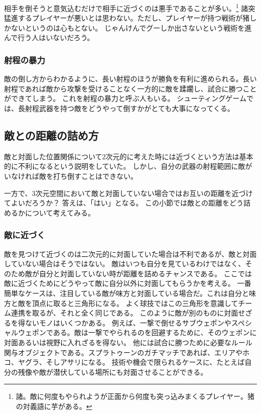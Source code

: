 \documentclass[a4paper,11pt]{jsbook}
\begin{document}
相手を倒そうと意気込むだけで相手に近づくのは悪手であることが多い。\footnote{諸。敵に何度もやられようが正面から何度も突っ込みまくるプレイヤー。猪の対義語に芋がある。}
諸突猛進するプレイヤーが悪いとは思わない。ただし、プレイヤーが持つ戦術が猪しかないというのは心もとない。
じゃんけんでグーしか出さないという戦術を進んで行う人はいないだろう。

\subsubsection{射程の暴力}
敵の倒し方からわかるように、長い射程のほうが勝負を有利に進められる。長い射程であれば敵から攻撃を受けることなく一方的に敵を蹂躙し、試合に勝つことができてしまう。
これを射程の暴力と呼ぶ人もいる。
シューティングゲームでは、長射程武器を持つ敵をどうやって倒すかがとても大事になってくる。

\subsection{敵との距離の詰め方}
敵と対面した位置関係について2次元的に考えた時には近づくという方法は基本的に不利になるという説明をしていた。
しかし、自分の武器の射程範囲に敵がいなければ敵を打ち倒すことはできない。

一方で、3次元空間において敵と対面していない場合ではお互いの距離を近づけてよいだろうか？
答えは、「はい」となる。
この小節では敵との距離をどう詰めるかについて考えてみる。
\subsubsection{敵に近づく}
敵を見つけて近づくのは二次元的に対面していた場合は不利であるが、敵と対面していない場合はそうではない。
敵はいつも自分を見ているわけではなく、そのため敵が自分と対面していない時が距離を詰めるチャンスである。
ここでは敵に近づくためにどうやって敵に自分以外に対面してもらうかを考える。
一番簡単なケースは、注目している敵が味方と対面している場合だ。これは自分と味方と敵を頂点に取ると三角形になる。
よく球技ではこの三角形を意識してチーム連携を取るが、それと全く同じである。
このように敵が別のものに対面せざるを得ないモノはいくつかある。
例えば、一撃で倒せるサブウェポンやスペシャルウェポンである。敵は一撃でやられるのを回避するために、そのウェポンに対面あるいは視野に入れざるを得ない。
他には試合に勝つために必要なルール関与オブジェクトである。スプラトゥーンのガチマッチであれば、エリアやホコ、ヤグラ、そしアサリになる。
技術や機会で限られるケースに、たとえば自分の残像や敵が潜伏している場所にも対面させることができる。
\end{document}
